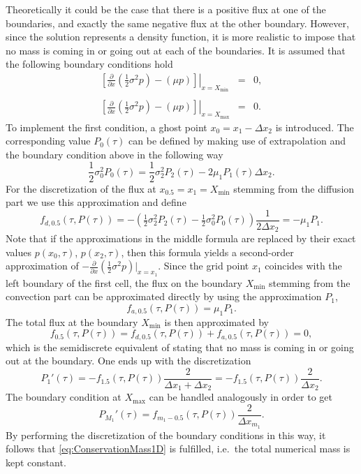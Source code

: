 \documentclass[10pt]{article}
\begin{document}
Theoretically it could be the case that there is a positive flux at one of the boundaries, and exactly the same negative flux at the other boundary. 
However, since the solution represents a density function, it is more realistic to impose that no mass is coming in or going out at each of the boundaries. It is assumed that the following boundary conditions hold
\begin{eqnarray*}
\left. \left[ \tfrac{\partial}{\partial x} \left( \tfrac{1}{2} \sigma^{2}p \right) - \left( \mu p \right) \right]\right\vert_{x=X_{\min}} &=& 0, \\\\
\left. \left[ \tfrac{\partial}{\partial x} \left( \tfrac{1}{2} \sigma^{2}p \right) - \left( \mu p \right) \right]\right\vert_{x=X_{\max}} &=& 0.
\end{eqnarray*}
To implement the first condition, a ghost point $x_{0}=x_{1}-\Delta x_{2}$ is introduced.
The corresponding value $P_{0}(\tau)$ can be defined by making use of extrapolation and the boundary condition above in the following way
\begin{equation}
\frac{1}{2} \sigma_{0}^{2} P_{0}(\tau) = \frac{1}{2} \sigma_{2}^{2} P_{2}(\tau) - 2 \mu_{1} P_{1}(\tau) \Delta x_{2}.
\label{eq:ExtrapolBoundary}
\end{equation}
For the discretization of the flux at $x_{0.5}=x_{1}=X_{\min}$ stemming from the diffusion part we use this approximation and define
$$ f_{d,0.5}(\tau,P(\tau)) = -\left(\tfrac{1}{2} \sigma^{2}_{2} P_{2}(\tau) - \tfrac{1}{2} \sigma^{2}_{0} P_{0}(\tau)\right) \frac{1}{2\Delta x_{2}} = -\mu_{1}P_{1}. $$
Note that if the approximations in the middle formula are replaced by their exact values $p(x_{0},\tau)$, $p(x_{2},\tau)$, then this formula yields a second-order approximation of $-\tfrac{\partial}{\partial x} \left( \tfrac{1}{2} \sigma^{2}p \right) \vert_{x=x_{1}}$.
Since the grid point $x_{1}$ coincides with the left boundary of the first cell, the flux on the boundary $X_{\min}$ stemming from the convection part can be approximated directly by using the approximation $P_{1}$,
$$ f_{a,0.5}(\tau,P(\tau)) = \mu_{1} P_{1}. $$
The total flux at the boundary $X_{\min}$ is then approximated by 
$$ f_{0.5}(\tau,P(\tau)) = f_{d,0.5}(\tau,P(\tau)) + f_{a,0.5}(\tau,P(\tau))=0, $$
which is the semidiscrete equivalent of stating that no mass is coming in or going out at the boundary.
One ends up with the discretization
$$ P_{1}'(\tau) = -f_{1.5}(\tau,P(\tau))\frac{2}{\Delta x_{1} + \Delta x_{2}} = -f_{1.5}(\tau,P(\tau))\frac{2}{\Delta x_{2}}. $$
The boundary condition at $X_{\max}$ can be handled analogously in order to get
$$ P_{M_{1}}'(\tau) = f_{m_{1}-0.5}(\tau,P(\tau)) \frac{2}{\Delta x_{m_{1}}}. $$ 
By performing the discretization of the boundary conditions in this way, it follows that \eqref{eq:ConservationMass1D} is fulfilled, i.e.\ the total numerical mass is kept constant. 
\end{document}
